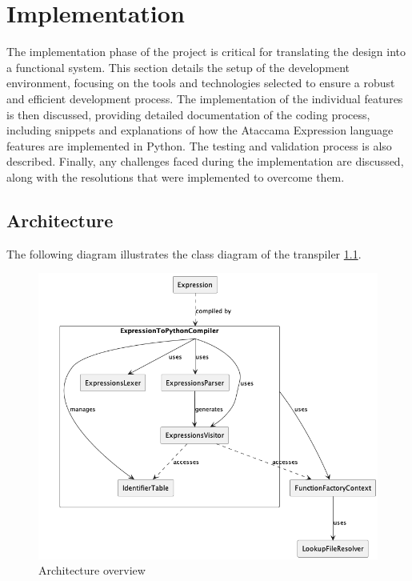 
\chapter{Implementation}

The implementation phase of the project is critical for translating the design into a functional system. This section details the setup of the development environment, focusing on the tools and technologies selected to ensure a robust and efficient development process. The implementation of the individual features is then discussed, providing detailed documentation of the coding process, including snippets and explanations of how the Ataccama Expression language features are implemented in Python. The testing and validation process is also described. Finally, any challenges faced during the implementation are discussed, along with the resolutions that were implemented to overcome them.

\section{Architecture}

The following diagram illustrates the class diagram of the transpiler \ref{fig:architecture}.

\begin{figure}[htbp]
    \centering
    \includegraphics[width=1.0\columnwidth]{diagrams/architecture.png}
    \caption{Architecture overview}
    \label{fig:architecture}
\end{figure}


